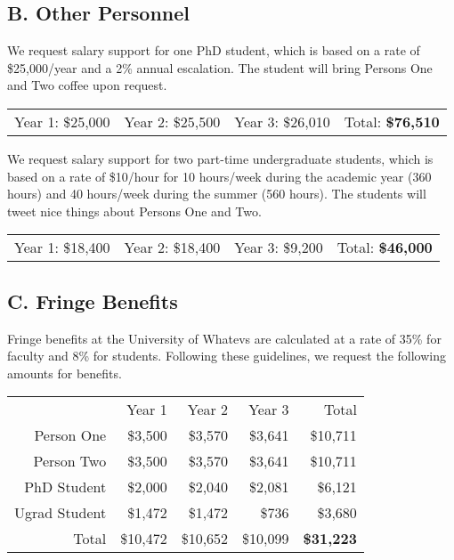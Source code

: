 \subsection*{B. Other Personnel}
 We request salary support for one PhD student, which is based on a rate of \$25,000/year and a 2\% annual escalation. The student will bring Persons One and Two coffee upon request.
\newline
\begin{table}[h]
\begin{tabular}[c]{cccc}
Year 1: \$25,000 & Year 2: \$25,500 & Year 3: \$26,010 & Total: \textbf{\$76,510}
\end{tabular}
\end{table}

 We request salary support for two part-time undergraduate students, which is based on a rate of \$10/hour for 10 hours/week during the academic year (360 hours) and 40 hours/week during the summer (560 hours). The students will tweet nice things about Persons One and Two.
\newline
\begin{table}[H]
\begin{tabular}[c]{cccc}
Year 1: \$18,400 & Year 2: \$18,400 & Year 3: \$9,200 & Total: \textbf{\$46,000}
\end{tabular}
\end{table}

\subsection*{C. Fringe Benefits}
Fringe benefits at the University of Whatevs are calculated at a rate of 35\% for faculty and 8\% for students. Following these guidelines, we request the following amounts for benefits.
\newline
\begin{table}[H]
\begin{tabular}[c]{r r r r | r}
                & Year 1     & Year 2     & Year 3     & Total\\
 Person One     & \$3,500    & \$3,570    & \$3,641    & \$10,711\\
 Person Two     & \$3,500    & \$3,570    & \$3,641    & \$10,711\\
 PhD Student    & \$2,000    & \$2,040    & \$2,081    & \$6,121\\
 Ugrad Student  & \$1,472    & \$1,472    & \$736      & \$3,680\\
 \hline
 Total          & \$10,472   & \$10,652   & \$10,099   & \textbf{\$31,223} \\
\end{tabular}
\end{table}

